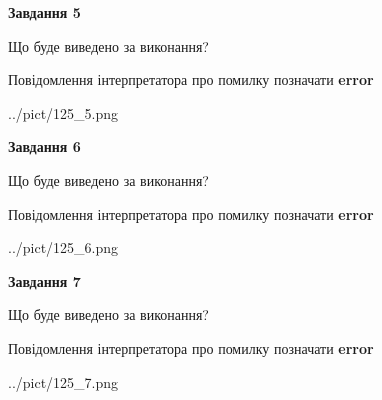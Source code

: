 \documentclass[10pt, ukrainian]{article}
\begin{document}
{\begin {large}
{\begin {center}\textbf{Завдання 5}\end {center}}\par
Що буде виведено за виконання? \par
Повідомлення інтерпретатора про помилку позначати \textbf{error}

\begin{center}
	{../pict/125_5.png}
\end{center}
\newpage

{\begin {center}\textbf{Завдання 6}\end {center}}\par
Що буде виведено за виконання? \par
Повідомлення інтерпретатора про помилку позначати \textbf{error}

\begin{center}
	{../pict/125_6.png}
\end{center}
\newpage

{\begin {center}\textbf{Завдання 7}\end {center}}\par
Що буде виведено за виконання? \par
Повідомлення інтерпретатора про помилку позначати \textbf{error}

\begin{center}
	{../pict/125_7.png}
\end{center}
\newpage

\end {large}}
\end{document}
